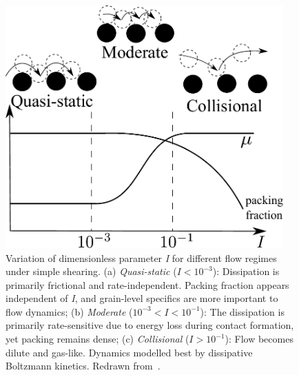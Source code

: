 \begin{figure}[tbhp]
\centering
\includegraphics[width=0.95\textwidth]{Regime}
\caption[Variation of dimensionless parameter \textit{I} for different flow 
regimes.]{Variation of dimensionless parameter \textit{I} for different 
flow regimes under simple shearing. (a) \textit{Quasi-static} ($I < 10^{-3}$): 
Dissipation is primarily frictional and rate-independent. Packing fraction 
appears independent of \textit{I}, and grain-level specifics are more important 
to flow dynamics; (b) \textit{Moderate} ($10^{-3} < I < 
10^{-1}$): The dissipation is primarily rate-sensitive due to energy loss 
during contact formation, yet packing remains dense; (c) \textit{Collisional} 
($I > 10^{-1}$): Flow becomes dilute and gas-like. Dynamics modelled best by 
dissipative Boltzmann kinetics. Redrawn from~\citet{Kamrin2008}.}
\label{fig:Regime}
\end{figure}


